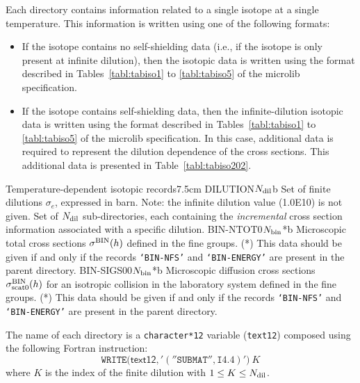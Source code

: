 Each  directory contains information related to a single isotope
at a single temperature. This information is written using one of the following formats:
\begin{itemize}
\item If the isotope contains no self-shielding data (i.e., if the isotope is
only present at infinite dilution), then the isotopic data is written using the format described
in Tables~\ref{tabl:tabiso1} to \ref{tabl:tabiso5} of the {\sc microlib}
specification.
\item If the isotope contains self-shielding data, then the infinite-dilution isotopic data is
written using the format described in Tables~\ref{tabl:tabiso1} to \ref{tabl:tabiso5} of the
{\sc microlib} specification. In this case, additional data is required to represent the
dilution dependence of the cross sections. This additional data is presented in Table~\ref{tabl:tabiso202}.
\end{itemize}

\begin{DescriptionEnregistrement}{Temperature-dependent isotopic records}{7.5cm}
\label{tabl:tabiso202}
\RealEnr
  {DILUTION}{$N_{\rm dil}$}{b}
  {Set of finite dilutions $\sigma_e$, expressed in barn. Note: the infinite dilution value (1.0E10) is not given.}
\DirVar
  {}
  {Set of $N_{\rm dil}$ sub-directories, each containing the {\sl incremental} cross section information
   associated with a specific dilution.}
\OptRealEnr
  {BIN-NTOT0}{$N_{\rm bin}$}{*}{b}
  {Microscopic total cross sections $\sigma^{\rm BIN}(h)$ defined in the fine groups. (*) This data should be given if and
  only if the records {\tt `BIN-NFS'} and {\tt `BIN-ENERGY'} are present in the parent directory.}
\OptRealEnr
  {BIN-SIGS00}{$N_{\rm bin}$}{*}{b}
  {Microscopic diffusion cross sections $\sigma^{\rm BIN}_{\rm scat0}(h)$ for an isotropic collision in the laboratory system defined
  in the fine groups. (*) This data should be given if and only if the records {\tt `BIN-NFS'}
  and {\tt `BIN-ENERGY'} are present in the parent directory.}
\end{DescriptionEnregistrement}

The name of each  directory is a {\tt character*12} variable ({\tt text12})
composed using the following Fortran instruction:
$$
\mathtt{WRITE(}\mathsf{text12}\mathtt{,'(''SUBMAT'',I4.4)')}\: K
$$
where $K$ is the index of the finite dilution with $1 \leq K \le N_{\rm dil}$.

